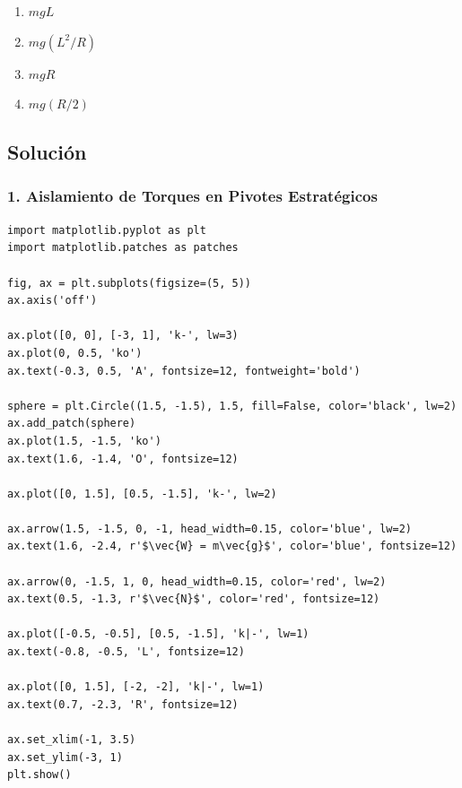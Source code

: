 \documentclass[12pt, a4paper]{article}
\begin{document}
\begin{center}
\end{center}

\begin{enumerate}[label=\alph*)]
    \item $mgL$
    \item $mg(L^2/R)$
    \item $mgR$
    \item $mg(R/2)$
\end{enumerate}

\subsection*{Solución}

\subsubsection*{1. Aislamiento de Torques en Pivotes Estratégicos}

\begin{verbatim}
import matplotlib.pyplot as plt
import matplotlib.patches as patches

fig, ax = plt.subplots(figsize=(5, 5))
ax.axis('off')

ax.plot([0, 0], [-3, 1], 'k-', lw=3)
ax.plot(0, 0.5, 'ko')
ax.text(-0.3, 0.5, 'A', fontsize=12, fontweight='bold')

sphere = plt.Circle((1.5, -1.5), 1.5, fill=False, color='black', lw=2)
ax.add_patch(sphere)
ax.plot(1.5, -1.5, 'ko')
ax.text(1.6, -1.4, 'O', fontsize=12)

ax.plot([0, 1.5], [0.5, -1.5], 'k-', lw=2)

ax.arrow(1.5, -1.5, 0, -1, head_width=0.15, color='blue', lw=2)
ax.text(1.6, -2.4, r'$\vec{W} = m\vec{g}$', color='blue', fontsize=12)

ax.arrow(0, -1.5, 1, 0, head_width=0.15, color='red', lw=2)
ax.text(0.5, -1.3, r'$\vec{N}$', color='red', fontsize=12)

ax.plot([-0.5, -0.5], [0.5, -1.5], 'k|-', lw=1)
ax.text(-0.8, -0.5, 'L', fontsize=12)

ax.plot([0, 1.5], [-2, -2], 'k|-', lw=1)
ax.text(0.7, -2.3, 'R', fontsize=12)

ax.set_xlim(-1, 3.5)
ax.set_ylim(-3, 1)
plt.show()
\end{verbatim}
\end{document}

